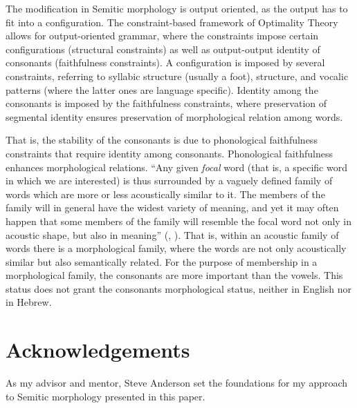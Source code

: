 \documentclass[output=paper,
modfonts
]{LSP/langsci}
\begin{document}
The modification in Semitic morphology is output oriented, as the output
has to fit into a configuration. The constraint-based framework of
Optimality Theory \citep{prince1993a} allows for
output-oriented grammar, where the constraints impose certain
configurations (structural constraints) as well as output-output
identity of consonants (faithfulness constraints). A configuration is
imposed by several constraints, referring to syllabic structure (usually
a foot),  structure, and vocalic patterns (where the latter ones
are language specific). Identity among the  consonants is imposed by
the faithfulness constraints, where preservation of segmental identity
ensures preservation of morphological relation among words.

That is, the stability of the  consonants is due to phonological
faithfulness constraints that require identity among  consonants.
Phonological faithfulness enhances morphological relations. ``Any given
\emph{focal} word (that is, a specific word in which we are interested)
is thus surrounded by a vaguely defined family of words which are more
or less acoustically similar to it. The members of the family will in
general have the widest variety of meaning, and yet it may often happen
that some members of the family will resemble the focal word not only in
acoustic shape, but also in meaning'' (\citealt[297]{Hockett1958}, \citeyear[86]{hockett1987a}). That
is, within an acoustic family of words there is a morphological family,
where the words are not only acoustically similar but also semantically
related. For the purpose of membership in a morphological family, the
consonants are more important than the vowels. This status does not
grant the consonants morphological status, neither in English nor in
Hebrew.

\section*{Acknowledgements}
As my advisor and mentor, Steve Anderson set the foundations for my approach to Semitic morphology presented in this paper.

{\sloppy
\printbibliography[heading=subbibliography,notkeyword=this]
}
\end{document}
